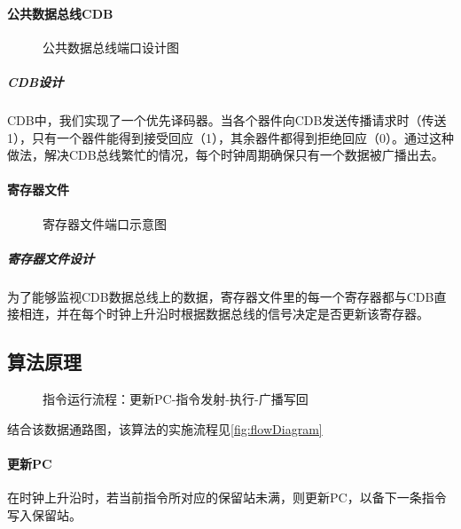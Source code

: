 \documentclass[twoside]{article}
\begin{document}
\paragraph{公共数据总线CDB}

\begin{figure}[htp]
    \centering
    \makebox[\textwidth]{\framebox[5cm]{\rule{0pt}{5cm}}}
    \caption{公共数据总线端口设计图}
    \label{fig:CDB}
\end{figure}

\subparagraph{CDB设计}
CDB中，我们实现了一个优先译码器。当各个器件向CDB发送传播请求时（传送1），只有一个器件能得到接受回应（1），其余器件都得到拒绝回应（0）。通过这种做法，解决CDB总线繁忙的情况，每个时钟周期确保只有一个数据被广播出去。  

\paragraph{寄存器文件}

\begin{figure}[htp]
    \centering
    \makebox[\textwidth]{\framebox[5cm]{\rule{0pt}{5cm}}}
    \caption{寄存器文件端口示意图}
    \label{fig:refFile}
\end{figure}

\subparagraph{寄存器文件设计}
为了能够监视CDB数据总线上的数据，寄存器文件里的每一个寄存器都与CDB直接相连，并在每个时钟上升沿时根据数据总线的信号决定是否更新该寄存器。


\subsection{算法原理}
\label{algo:tomasulo}

\begin{figure}[htp]
    \centering
    \makebox[\textwidth]{\framebox[5cm]{\rule{0pt}{5cm}}}
    \caption{指令运行流程：更新PC-指令发射-执行-广播写回}
    \label{fig:flowDiagram}
\end{figure}

结合该数据通路图，该算法的实施流程见\autoref{fig:flowDiagram}
\paragraph{更新PC}
在时钟上升沿时，若当前指令所对应的保留站未满，则更新PC，以备下一条指令写入保留站。
\end{document}
